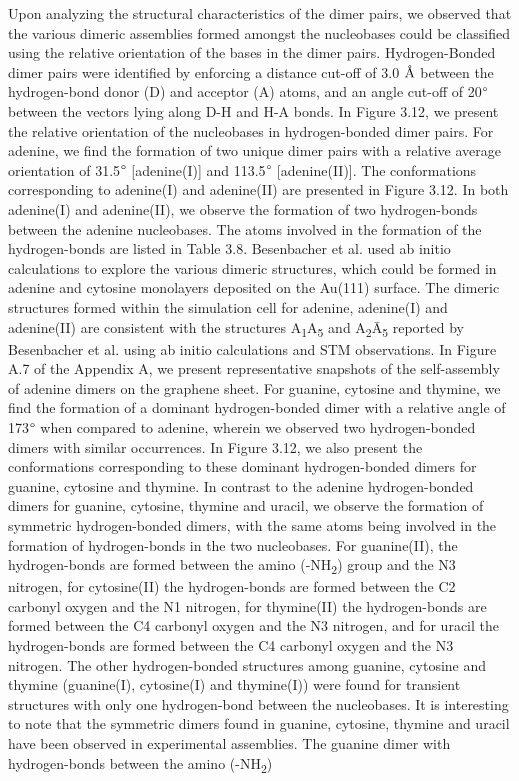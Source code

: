     Upon analyzing the structural characteristics of the dimer pairs, we observed that the various dimeric assemblies formed amongst the nucleobases could be classified using the relative orientation of the bases in the dimer pairs. Hydrogen-Bonded dimer pairs were identified by enforcing a distance cut-off of 3.0 $\text{\normalfont\AA}$ between the hydrogen-bond donor (D) and acceptor (A) atoms, and an angle cut-off of 20$\degree$ between the vectors lying along D-H and H-A bonds. In Figure 3.12, we present the relative orientation of the nucleobases in hydrogen-bonded dimer pairs. For adenine, we find the formation of two unique dimer pairs with a relative average orientation of 31.5$\degree$ [adenine(I)] and 113.5$\degree$ [adenine(II)]. The conformations corresponding to adenine(I) and adenine(II) are presented in Figure 3.12.  In both adenine(I) and adenine(II), we observe the formation of two hydrogen-bonds between the adenine nucleobases. The atoms involved in the formation of the hydrogen-bonds are listed in Table 3.8.  Besenbacher et al. used ab initio calculations to explore the various dimeric structures, which could be formed in adenine and cytosine monolayers deposited on the Au(111) surface.\supercite{kelly_understanding_2008, lukas_adenine_2009} The dimeric structures formed within the simulation cell for adenine, adenine(I) and adenine(II) are consistent with the structures A\textsubscript{1}A\textsubscript{5} and A\textsubscript{2}\={A}\textsubscript{5} reported by Besenbacher et al.\supercite{kelly_understanding_2008} using ab initio calculations and STM observations. In Figure A.7 of the Appendix A, we present representative snapshots of the self-assembly of adenine dimers on the graphene sheet. For guanine, cytosine and thymine, we find the formation of a dominant hydrogen-bonded dimer with a relative angle of 173$\degree$ when compared to adenine, wherein we observed two hydrogen-bonded dimers with similar occurrences.  In Figure 3.12, we also present the conformations corresponding to these dominant hydrogen-bonded dimers for guanine, cytosine and thymine. In contrast to the adenine hydrogen-bonded dimers for guanine, cytosine, thymine and uracil, we observe the formation of symmetric hydrogen-bonded dimers, with the same atoms being involved in the formation of hydrogen-bonds in the two nucleobases. For guanine(II), the hydrogen-bonds are formed between the amino (-NH\textsubscript{2}) group and the N3 nitrogen, for cytosine(II) the hydrogen-bonds are formed between the C2 carbonyl oxygen and the N1 nitrogen, for thymine(II) the hydrogen-bonds are formed between the C4 carbonyl oxygen and the N3 nitrogen, and for uracil the hydrogen-bonds are formed between the C4 carbonyl oxygen and the N3 nitrogen. The other hydrogen-bonded structures among guanine, cytosine and thymine (guanine(I), cytosine(I) and thymine(I)) were found for transient structures with only one hydrogen-bond between the nucleobases. It is interesting to note that the symmetric dimers found in guanine, cytosine, thymine and uracil have been observed in experimental assemblies.\supercite{kelly_understanding_2008, lukas_adenine_2009, sowerby_scanning_1997, otero_elementary_2008, spada_guanosine-based_2008, xu_probing_2007} The guanine dimer with hydrogen-bonds between the amino (-NH\textsubscript{2}) 
